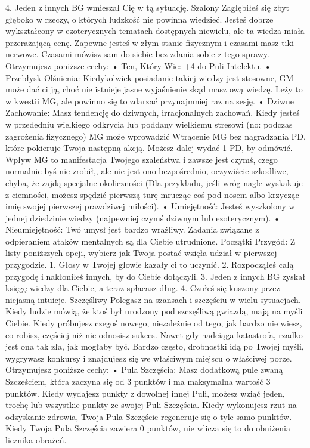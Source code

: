4. Jeden z innych BG wmieszał Cię w tą sytuację.
Szalony
Zagłębiłeś się zbyt głęboko w rzeczy, o których ludzkość nie powinna wiedzieć. Jesteś dobrze wykształcony w ezoterycznych tematach dostępnych niewielu, ale ta wiedza miała przerażającą cenę. Zapewne jesteś w złym stanie fizycznym i czasami masz tiki nerwowe. Czasami mówisz sam do siebie bez zdania sobie z tego sprawy.
Otrzymujesz poniższe cechy:
    • Ten, Który Wie: +4 do Puli Intelektu.
    • Przebłysk Olśnienia: Kiedykolwiek posiadanie takiej wiedzy jest stosowne, GM może dać ci ją, choć nie istnieje jasne wyjaśnienie skąd masz ową wiedzę. Leży to w kwestii MG, ale powinno się to zdarzać przynajmniej raz na sesję.
    • Dziwne Zachowanie: Masz tendencję do dziwnych, irracjonalnych zachowań. Kiedy jesteś w przededniu wielkiego odkrycia lub poddany wielkiemu stresowi (no: podczas zagrożenia fizycznego) MG może wprowadzić Wtrącenie MG bez nagradzania PD, które pokieruje Twoja następną akcją. Możesz dalej wydać 1 PD, by odmówić. Wpływ MG to manifestacja Twojego szaleństwa i zawsze jest czymś, czego normalnie byś nie zrobił,, ale nie jest ono bezpośrednio, oczywiście szkodliwe, chyba, że zajdą specjalne okoliczności (Dla przykładu, jeśli wróg nagle wyskakuje z ciemności, możesz spędzić pierwszą turę mrucząc coś pod nosem albo krzycząc imię swojej pierwszej prawdziwej miłości). 
    • Umiejętność: Jesteś wyszkolony w jednej dziedzinie wiedzy (najpewniej czymś dziwnym lub ezoterycznym).
    • Nieumiejętność: Twó umysł jest bardzo wrażliwy. Zadania związane z odpieraniem ataków mentalnych są dla Ciebie utrudnione.
Początki Przygód: Z listy poniższych opcji, wybierz jak Twoja postać wzięła udział w pierwszej przygodzie.
1. Głosy w Twojej głowie kazały ci to uczynić.
2. Rozpocząłeś całą przygodę i nakłoniłeś innych, by do Ciebie dołączyli.
3. Jeden z innych BG zyskał księgę wiedzy dla Ciebie, a teraz spłacasz dług.
4. Czułeś się kuszony przez niejasną intuicje.
Szczęśliwy
Polegasz na szansach i szczęściu w wielu sytuacjach. Kiedy ludzie mówią, że ktoś był urodzony pod szczęśliwą gwiazdą, mają na myśli Ciebie. Kiedy próbujesz czegoś nowego, niezależnie od tego, jak bardzo nie wiesz, co robisz, częściej niż nie odnosisz sukces. Nawet gdy nadciąga katastrofa, rzadko jest ona tak zła, jak mogłaby być. Bardzo często, drobnostki idą po Twojej myśli, wygrywasz konkursy i znajdujesz się we właściwym miejscu o właściwej porze.
Otrzymujesz poniższe cechy:
    • Pula Szczęścia: Masz dodatkową pule zwaną Szcześciem, która zaczyna się od 3 punktów i ma maksymalna wartość 3 punktów. Kiedy wydajesz punkty z dowolnej innej Puli, możesz wziąć jeden, trochę lub wszystkie punkty ze swojej Puli Szczęścia. Kiedy wykonujesz rzut na odzyskanie zdrowia, Twoja Pula Szczęście regeneruje się o tyle samo punktów. Kiedy Twoja Pula Szczęścia zawiera 0 punktów, nie wlicza się to do obniżenia licznika obrażeń. 
